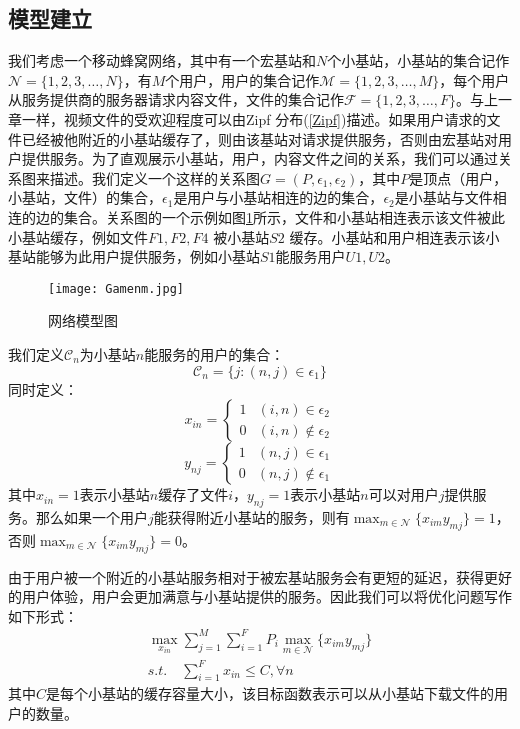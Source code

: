 \documentclass[bachelor]{seuthesis} %
\begin{document}
\begin{Main}
\section{模型建立}
我们考虑一个移动蜂窝网络，其中有一个宏基站和$N$个小基站，小基站的集合记作$\mathcal{N}=\{1,2,3,\dots,N\}$，有$M$个用户，用户的集合记作$\mathcal{M}=\{1,2,3,\dots,M\}$，每个用户从服务提供商的服务器请求内容文件，文件的集合记作$\mathcal{F}=\{1,2,3,\dots,F\}$。与上一章一样，视频文件的受欢迎程度可以由Zipf 分布(\ref{Zipf})描述。如果用户请求的文件已经被他附近的小基站缓存了，则由该基站对请求提供服务，否则由宏基站对用户提供服务。为了直观展示小基站，用户，内容文件之间的关系，我们可以通过关系图来描述。我们定义一个这样的关系图$G=(P,\epsilon_1,\epsilon_2)$，其中$P$是顶点（用户，小基站，文件）的集合，$\epsilon_1$是用户与小基站相连的边的集合，$\epsilon_2$是小基站与文件相连的边的集合。关系图的一个示例如图\ref{Gamenm}所示，文件和小基站相连表示该文件被此小基站缓存，例如文件$F1,F2,F4$ 被小基站$S2$ 缓存。小基站和用户相连表示该小基站能够为此用户提供服务，例如小基站$S1$能服务用户$U1,U2$。\par
\begin{figure}{}
\centering
\texttt{[image: Gamenm.jpg]}
\caption{网络模型图}\label{Gamenm}
\end{figure}
我们定义$\mathcal{C}_n$为小基站$n$能服务的用户的集合：
\begin{equation}
\mathcal{C}_n=\{j:(n,j)\in\epsilon_1\}
\end{equation}
同时定义：
\begin{equation}
x_{in}=\begin{cases}
1&(i,n)\in\epsilon_2\\
0&(i,n)\notin\epsilon_2
\end{cases}
\end{equation}
\begin{equation}
y_{nj}=\begin{cases}
1&(n,j)\in\epsilon_1\\
0&(n,j)\notin\epsilon_1
\end{cases}
\end{equation}
其中$x_{in}=1$表示小基站$n$缓存了文件$i$，$y_{nj}=1$表示小基站$n$可以对用户$j$提供服务。那么如果一个用户$j$能获得附近小基站的服务，则有$\max_{m\in\mathcal{N}}\{x_{im}y_{mj}\}=1$，否则$\max_{m\in\mathcal{N}}\{x_{im}y_{mj}\}=0$。\par
由于用户被一个附近的小基站服务相对于被宏基站服务会有更短的延迟，获得更好的用户体验，用户会更加满意与小基站提供的服务。因此我们可以将优化问题写作如下形式：
\begin{equation}\label{Game}
\begin{split}
\max_{x_{in}}\sum_{j=1}^M\sum_{i=1}^FP_i\max_{m\in\mathcal{N}}\{x_{im}y_{mj}\}\\
s.t.\quad\sum_{i=1}^Fx_{in}\leq C,\forall n
\end{split}
\end{equation}
其中$C$是每个小基站的缓存容量大小，该目标函数表示可以从小基站下载文件的用户的数量。

\end{Main}
\end{document}
